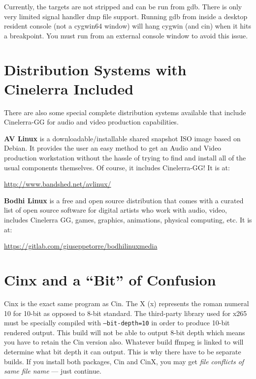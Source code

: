 Currently, the targets are not stripped and can be run from gdb.
There is only very limited signal handler dmp file support.
Running gdb from inside a desktop resident console (not a cygwin64 window) will hang cygwin (and cin) when it hits a breakpoint.  You must run from an external console window to avoid this issue.


\section{Distribution Systems with Cinelerra Included}%
\label{sec:distribution_systems_with_cinelerra_included}

There are also some special complete distribution systems available that include Cinelerra-GG for audio and video production capabilities.

\textbf{AV Linux} is a downloadable/installable shared snapshot ISO image based on Debian. 
It provides the user an easy method to get an Audio and Video production workstation without the hassle of trying to find and install all of the usual components themselves. 
Of course, it includes Cinelerra-GG!  
It is at:

\begin{center}
	{\small \url{http://www.bandshed.net/avlinux/}}
\end{center}

\textbf{Bodhi Linux} is a free and open source distribution that comes with a curated list of open source software for digital artists who work with audio, video, includes Cinelerra GG, games, graphics, animations, physical computing, etc.  
It is at:

\begin{center}
	{\small \url{https://gitlab.com/giuseppetorre/bodhilinuxmedia}}
\end{center}	

\section{Cinx and a “Bit” of Confusion}%
\label{sec:cinx_and_a_bit_of_confusion}

Cinx is the exact same program as Cin.  
The X (x) represents the roman numeral 10 for 10-bit as opposed to 8-bit standard.  
The third-party library used for x265 must be specially compiled with \texttt{--bit-depth=10} in order to produce 10-bit rendered output.  
This build will not be able to output 8-bit depth which means you have to retain the Cin version also.  
Whatever build ffmpeg is linked to will determine what bit depth it can output.  
This is why there have to be separate builds.  
If you install both packages, Cin and CinX, you may get \textit{file conflicts of same file name} --- just continue.

